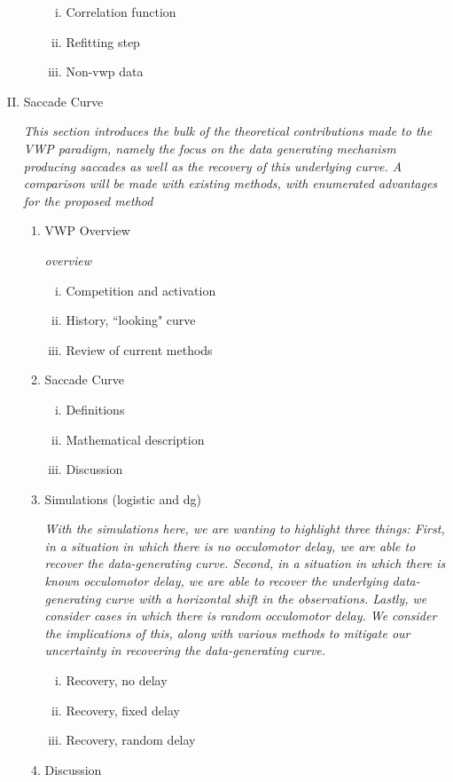 \documentclass[12pt, letterpaper, twoside]{article}
\begin{document}
\begin{enumerate}[I.]
\begin{enumerate}[1.]
    \begin{enumerate}[i.]
    \item Correlation function
    \item Refitting step
    \item Non-vwp data
    \end{enumerate}
  \end{enumerate}
\item Saccade Curve

\textit{This section introduces the bulk of the theoretical contributions made to the VWP paradigm, namely the focus on the data generating mechanism producing saccades as well as the recovery of this underlying curve. A comparison will be made with existing methods, with enumerated advantages for the proposed method}

  \begin{enumerate}[1.]
  \item VWP Overview

\textit{overview}  
  
    \begin{enumerate}[i.]
    \item Competition and activation
    \item History, ``looking" curve
    \item Review of current methods
    \end{enumerate}
  \item Saccade Curve
    \begin{enumerate}[i.]
    \item Definitions
    \item Mathematical description
    \item Discussion
    \end{enumerate}
  \item Simulations (logistic and dg)

\textit{With the simulations here, we are wanting to highlight three things: First, in a situation in which there is no occulomotor delay, we are able to recover the data-generating curve. Second, in a situation in which there is known occulomotor delay, we are able to recover the underlying data-generating curve with a horizontal shift in the observations. Lastly, we consider cases in which there is random occulomotor delay. We consider the implications of this, along with various methods to mitigate our uncertainty in recovering the data-generating curve.}  
  
    \begin{enumerate}[i.]
    \item Recovery, no delay
    \item Recovery, fixed delay
    \item Recovery, random delay
    \end{enumerate}
  \item Discussion


\end{enumerate}
\end{enumerate}
\end{document}
